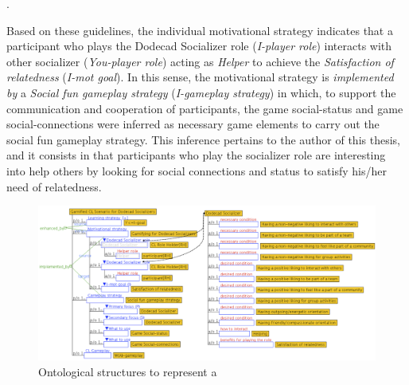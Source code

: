 \begin{citacao}
 .
\end{citacao}

Based on these guidelines, the individual motivational strategy  indicates that a participant who plays the Dodecad Socializer role (\emph{I-player role}) interacts with other socializer (\emph{You-player role}) acting as \emph{Helper} to achieve the \emph{Satisfaction of relatedness} (\emph{I-mot goal}). In this sense, the motivational strategy is \emph{implemented by} a \emph{Social fun gameplay strategy} (\emph{I-gameplay strategy}) in which, to support the communication and cooperation of participants, the game social-status and game social-connections were inferred as necessary game elements to carry out the social fun gameplay strategy. This inference pertains to the author of this thesis, and it consists in that participants who play the socializer role are interesting into help others by looking for social connections and status to satisfy his/her need of relatedness.

\begin{figure}[!htbp]
 \caption[Ontological structures to represent a gamified CL scenario for dodecad socializers]{Ontological structures to represent a }
 \label{fig:ontological-structure-gamified-cl-scenario-dodecad-socializers}
 \centering
 \includegraphics[width=1\textwidth]{images/chap-ontogacles1/ontological-structure-gamified-cl-scenario-dodecad-socializers.png} 
 \fautor
\end{figure}

